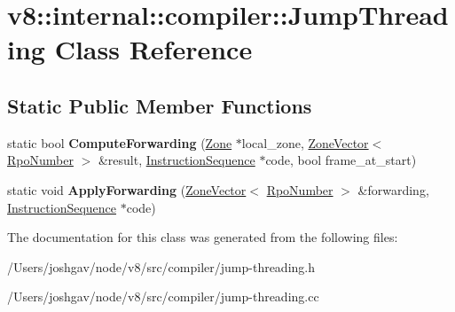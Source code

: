 \hypertarget{classv8_1_1internal_1_1compiler_1_1_jump_threading}{}\section{v8\+:\+:internal\+:\+:compiler\+:\+:Jump\+Threading Class Reference}
\label{classv8_1_1internal_1_1compiler_1_1_jump_threading}
\subsection*{Static Public Member Functions}
\begin{DoxyCompactItemize}
\item 
static bool {\bfseries Compute\+Forwarding} (\hyperlink{classv8_1_1internal_1_1_zone}{Zone} $\ast$local\+\_\+zone, \hyperlink{classv8_1_1internal_1_1_zone_vector}{Zone\+Vector}$<$ \hyperlink{classv8_1_1internal_1_1compiler_1_1_rpo_number}{Rpo\+Number} $>$ \&result, \hyperlink{classv8_1_1internal_1_1compiler_1_1_instruction_sequence}{Instruction\+Sequence} $\ast$code, bool frame\+\_\+at\+\_\+start)\hypertarget{classv8_1_1internal_1_1compiler_1_1_jump_threading_a1a362fb15d7b05df5fe56545a308b117}{}\label{classv8_1_1internal_1_1compiler_1_1_jump_threading_a1a362fb15d7b05df5fe56545a308b117}

\item 
static void {\bfseries Apply\+Forwarding} (\hyperlink{classv8_1_1internal_1_1_zone_vector}{Zone\+Vector}$<$ \hyperlink{classv8_1_1internal_1_1compiler_1_1_rpo_number}{Rpo\+Number} $>$ \&forwarding, \hyperlink{classv8_1_1internal_1_1compiler_1_1_instruction_sequence}{Instruction\+Sequence} $\ast$code)\hypertarget{classv8_1_1internal_1_1compiler_1_1_jump_threading_ad2501c1fea9b6c9ee677af6dcb9694da}{}\label{classv8_1_1internal_1_1compiler_1_1_jump_threading_ad2501c1fea9b6c9ee677af6dcb9694da}

\end{DoxyCompactItemize}


The documentation for this class was generated from the following files\+:\begin{DoxyCompactItemize}
\item 
/\+Users/joshgav/node/v8/src/compiler/jump-\/threading.\+h\item 
/\+Users/joshgav/node/v8/src/compiler/jump-\/threading.\+cc\end{DoxyCompactItemize}
